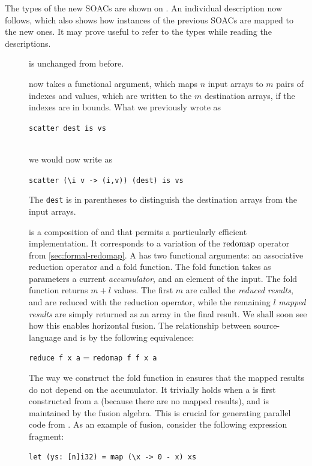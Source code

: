 The types of the new SOACs are shown on .  An
individual description now follows, which also shows how instances of
the previous SOACs are mapped to the new ones.  It may prove useful to
refer to the types while reading the descriptions.

\begin{description}
\item[{}] is unchanged from before.
\item[{}] now takes a functional argument, which maps $n$
  input arrays to $m$ pairs of indexes and values, which are written
  to the $m$ destination arrays, if the indexes are in bounds.
  What we previously wrote as\\
  \centerline{\lstinline{scatter dest is vs}}\\
  we would now write as\\
  \centerline{\lstinline{scatter (\i v -> (i,v)) (dest) is vs}} The
  \lstinline{dest} is in parentheses to distinguish the destination
  arrays from the input arrays.
\item[] is a composition of  and  that
  permits a particularly efficient implementation.  It corresponds to
  a variation of the $\mathrm{redomap}$ operator from
  \cref{sec:formal-redomap}.  A  has two functional
  arguments: an associative reduction operator and a fold function.
  The fold function takes as parameters a current
  \textit{accumulator}, and an element of the input.  The 
  fold function returns $m+l$ values.  The first $m$ are called the
  \textit{reduced results}, and are reduced with the reduction
  operator, while the remaining $l$ \textit{mapped results} are simply
  returned as an array in the final result.  We shall soon see how
  this enables horizontal fusion.  The relationship between
  source-language  and  is by the
  following equivalence:\\
  \centerline{\lstinline{reduce f x a} = \lstinline{redomap f f x a}}
  The way we construct the fold function in  ensures that
  the mapped results do not depend on the accumulator.  It trivially
  holds when a  is first constructed from a 
  (because there are no mapped results), and is maintained by the
  fusion algebra.  This is crucial for generating parallel code from
  .  As an example of  fusion, consider the
  following expression fragment:
\begin{lstlisting}
let (ys: [n]i32) = map (\x -> 0 - x) xs

\end{lstlisting}
\end{description}

